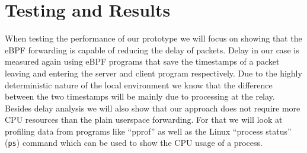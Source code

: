 \section{Testing and Results}\label{sec:testing_and_results}
When testing the performance of our prototype we will focus on showing that the eBPF forwarding
is capable of reducing the delay of packets.
Delay in our case is measured again using eBPF programs that save the timestamps of a packet 
leaving and entering the server and client program respectively.
Due to the highly deterministic nature of the local environment we know that the difference 
between the two timestamps will be mainly due to processing at the relay.
Besides delay analysis we will also show that our approach does not require more CPU resources
than the plain userspace forwarding.
For that we will look at profiling data from programs like ``pprof'' %
as well as the Linux ``process status'' (\verb|ps|) command which can be used to 
show the CPU usage of a process. %

